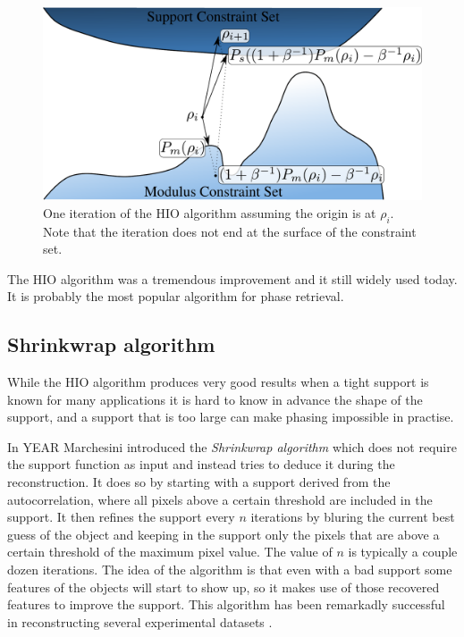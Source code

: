 \begin{figure}[h]
\centering
  \includegraphics[width=0.9 \columnwidth]{Image_Reconstruction/hio_iteration.pdf}
  \caption{One iteration of the HIO algorithm assuming the origin is at
    $\rho_i$. Note that the iteration does not end at the surface of the
    constraint set.}
  \label{Fig:HIO_Iteration}
\end{figure}

The HIO algorithm was a tremendous improvement and it still widely used
today. It is probably the most popular algorithm for phase retrieval. 

\subsection{Shrinkwrap algorithm}

While the HIO algorithm produces very good results when a tight support is known
for many applications it is hard to know in advance the shape of the support,
and a support that is too large can make phasing impossible in practise. 

In YEAR Marchesini \cite{MarchesiniYEAR} introduced the {\em Shrinkwrap
  algorithm} which does not require the support function as input and instead
tries to deduce it during the reconstruction. It does so by starting with a
support derived from the autocorrelation, where all pixels above a certain
threshold are included in the support. It then refines the support every $n$
iterations by bluring the current best guess of the object and keeping in the
support only the pixels that are above a certain threshold of the maximum pixel
value. The value of $n$ is typically a couple dozen iterations. The idea of the
algorithm is that even with a bad support some features of the objects will
start to show up, so it makes use of those recovered features to improve the
support. This algorithm has been remarkadly successful in reconstructing several
experimental datasets \cite{Piramid,Cowboys,Gel Foam, Pacman}.

